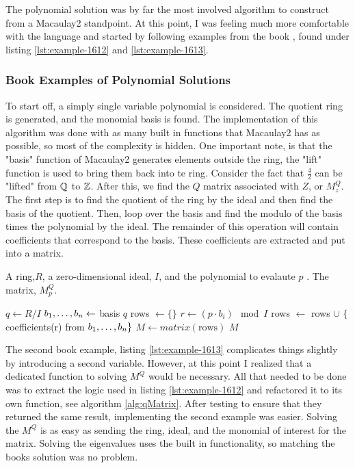 The polynomial solution was by far the most involved algorithm to construct from a Macaulay2 standpoint. At this point, I was feeling much more comfortable with the language and started by following examples from the book \cite{Applied}, found under listing \ref{lst:example-1612} and \ref{lst:example-1613}. 

\subsubsection{Book Examples of Polynomial Solutions}
\label{sssec:book-examples-polynomial-solutions}
To start off, a simply single variable polynomial is considered. The quotient ring is generated, and the monomial basis is found. The implementation of this algorithm was done with as many built in functions that Macaulay2 has as possible, so most of the complexity is hidden. One important note, is that the "basis" function of Macaulay2 generates elements outside the ring, the "lift" function is used to bring them back into te ring. Consider the fact that $\frac{4}{2}$ can be "lifted" from $\mathbb{Q}$ to $\mathbb{Z}$. After this, we find the $Q$ matrix associated with $Z$, or $M_z^Q$. The first step is to find the quotient of the ring by the ideal and then find the basis of the quotient. Then, loop over the basis and find the modulo of the basis times the polynomial by the ideal. The remainder of this operation will contain coefficients that correspond to the basis. These coefficients are extracted and put into a matrix.

\begin{algorithm}[ht]
\caption{SolveQMatrix}
\label{alg:qMatrix}
\begin{algorithmic}[1]
\Require A ring,$R$, a zero-dimensional ideal, $I$, and the polynomial to evalaute $p$ .
\Ensure The matrix, $M_p^Q$. 

\State $ q \gets R / I$
\State $b_1, \dots, b_n \gets$ basis $q$
\State rows $ \gets \lbrace \rbrace$
    \State $r\gets (p \cdot b_i)\mod I$
    \State rows $\gets$ rows $\cup$ $\lbrace$ coefficients(r) from $b_1, \dots, b_n \rbrace$
\EndFor
\State $M \gets matrix(\text{rows})$
\State \Return $M$
\end{algorithmic}
\end{algorithm}

The second book example, listing \ref{lst:example-1613} complicates things slightly by introducing a second variable. However, at this point I realized that a dedicated function to solving $M^Q$ would be necessary. All that needed to be done was to extract the logic used in listing \ref{lst:example-1612} and refactored it to its own function, see algorithm \ref{alg:qMatrix}. After testing to ensure that they returned the same result, implementing the second example was easier. Solving the $M^Q$ is as easy as sending the ring, ideal, and the monomial of interest for the matrix. Solving the eigenvalues uses the built in functionality, so matching the books solution was no problem. 

